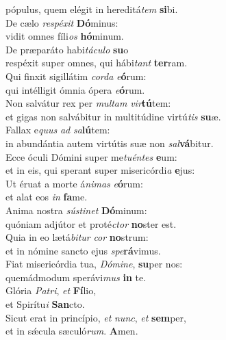\evenverse pópulus, quem elégit in hereditá\textit{tem} \textbf{si}bi.\\
\oddverse De cælo \textit{re}\textit{spé}\textit{xit} \textbf{Dó}minus:~\*\\
\oddverse vidit omnes fíli\textit{os} \textbf{hó}minum.\\
\evenverse De præparáto habi\textit{tá}\textit{cu}\textit{lo} \textbf{su}o~\*\\
\evenverse respéxit super omnes, qui hábi\textit{tant} \textbf{ter}ram.\\
\oddverse Qui finxit sigillátim \textit{cor}\textit{da} \textit{e}\textbf{ó}rum:~\*\\
\oddverse qui intélligit ómnia ópera \textit{e}\textbf{ó}rum.\\
\evenverse Non salvátur rex per \textit{mul}\textit{tam} \textit{vir}\textbf{tú}tem:~\*\\
\evenverse et gigas non salvábitur in multitúdine virtú\textit{tis} \textbf{su}æ.\\
\oddverse Fallax e\textit{quus} \textit{ad} \textit{sa}\textbf{lú}tem:~\*\\
\oddverse in abundántia autem virtútis suæ non \textit{sal}\textbf{vá}bitur.\\
\evenverse Ecce óculi Dómini super me\textit{tu}\textit{én}\textit{tes} \textbf{e}um:~\*\\
\evenverse et in eis, qui sperant super misericórdi\textit{a} \textbf{e}jus:\\
\oddverse Ut éruat a morte á\textit{ni}\textit{mas} \textit{e}\textbf{ó}rum:~\*\\
\oddverse et alat eos \textit{in} \textbf{fa}me.\\
\evenverse Anima nostra \textit{sú}\textit{sti}\textit{net} \textbf{Dó}minum:~\*\\
\evenverse quóniam adjútor et proté\textit{ctor} \textbf{no}ster est.\\
\oddverse Quia in eo lætá\textit{bi}\textit{tur} \textit{cor} \textbf{no}strum:~\*\\
\oddverse et in nómine sancto ejus \textit{spe}\textbf{rá}vimus.\\
\evenverse Fiat misericórdia tua, \textit{Dó}\textit{mi}\textit{ne}, \textbf{su}per nos:~\*\\
\evenverse quemádmodum sperávi\textit{mus} \textbf{in} te.\\
\oddverse Glória \textit{Pa}\textit{tri}, \textit{et} \textbf{Fí}lio,~\*\\
\oddverse et Spirítu\textit{i} \textbf{San}cto.\\
\evenverse Sicut erat in princípio, \textit{et} \textit{nunc}, \textit{et} \textbf{sem}per,~\*\\
\evenverse et in sǽcula sæculó\textit{rum}. \textbf{A}men.\\
